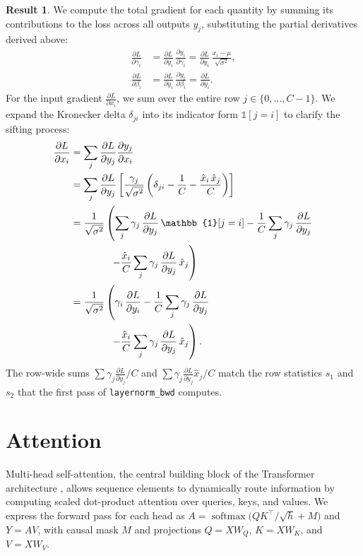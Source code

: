 \documentclass[letterpaper, 10 pt, conference]{ieeeconf}
\newcommand{\pdv}[2]{\frac{\partial #1}{\partial #2}}
\newcommand{\dL}[1]{\pdv{L}{#1}}
\newcommand{\ind}[1]{\mathbb{1}\!\left[#1\right]}
\newcommand{\kron}[2]{\delta_{#1 #2}}
\DeclareMathOperator{\softmax}{softmax}
\theoremstyle{definition}
\newtheorem*{result}{Result}
\begin{document}
\begin{result}
  We compute the total gradient for each quantity by summing its contributions to the loss across all outputs $y_j$, substituting the partial derivatives derived above:
  \begin{align}
    \dL{\gamma_i} & = \dL{y_i}\,\pdv{y_i}{\gamma_i} = \dL{y_i}\,\frac{x_i - \mu}{\sqrt{\sigma^2}}, \\
    \dL{\beta_i}  & = \dL{y_i}\,\pdv{y_i}{\beta_i} = \dL{y_i}.
  \end{align}
  For the input gradient $\dL{x_i}$, we sum over the entire row $j \in \{0, \dots, C-1\}$. We expand the Kronecker delta $\kron{j}{i}$ into its indicator form $\ind{j=i}$ to clarify the sifting process:
  \begin{align}
    \dL{x_i}
     & = \sum_j \dL{y_j} \pdv{y_j}{x_i} \notag                                                                                                            \\
     & = \sum_j \dL{y_j} \left[ \frac{\gamma_j}{\sqrt{\sigma^2}} \left( \kron{j}{i} - \frac{1}{C} - \frac{\hat{x}_i\,\hat{x}_j}{C} \right) \right] \notag \\
     & = \frac{1}{\sqrt{\sigma^2}} \left( \sum_j \gamma_j\,\dL{y_j}\,\ind{j=i} - \frac{1}{C} \sum_j \gamma_j\,\dL{y_j} \right. \notag                     \\
     & \qquad\qquad \left. - \frac{\hat{x}_i}{C} \sum_j \gamma_j\,\dL{y_j}\,\hat{x}_j \right) \notag                                                      \\
     & = \frac{1}{\sqrt{\sigma^2}} \left( \gamma_i\,\dL{y_i} - \frac{1}{C} \sum_j \gamma_j\,\dL{y_j} \right. \notag                                       \\
     & \qquad\qquad \left. - \frac{\hat{x}_i}{C} \sum_j \gamma_j\,\dL{y_j}\,\hat{x}_j \right).
    \label{eq:ln-bwd}
  \end{align}
  The row-wide sums $\sum \gamma_j \dL{y_j} / C$ and $\sum \gamma_j \dL{y_j} \hat{x}_j / C$ match the row statistics $s_1$ and $s_2$ that the first pass of \texttt{layernorm\_bwd} computes.
\end{result}

\section{Attention}\label{sec:attention}

Multi-head self-attention, the central building block of the Transformer architecture \cite{attention}, allows sequence elements to dynamically route information by computing scaled dot-product attention over queries, keys, and values. We express the forward pass for each head as $A = \softmax\!\big(QK^{\top}/\sqrt{h} + M\big)$ and $Y = AV$, with causal mask $M$ and projections $Q = XW_Q$, $K = XW_K$, and $V = XW_V$.
\end{document}
